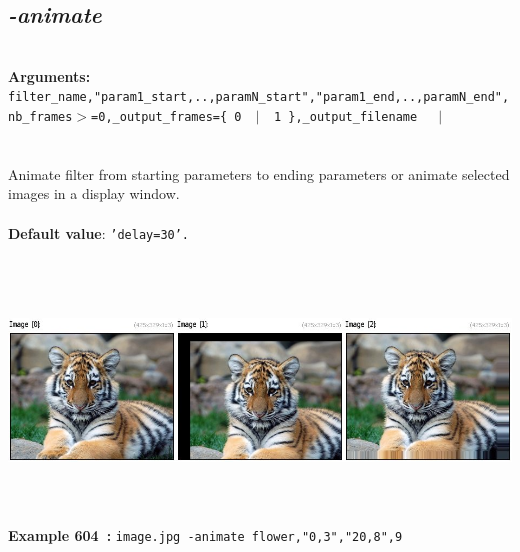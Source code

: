 \documentclass[a4paper,11pt,twoside]{book}
\begin{document}
\subsection{\emph{-animate} }\vspace*{-0.5em}
~\\\textbf{Arguments: } 
{\small \texttt{filter\_name,"param1\_start,..,paramN\_start","param1\_end,..,paramN\_end",nb\_frames$>$=0,\_output\_frames=\{ 0 ~$|$~ 1 \},\_output\_filename}}~~~$|$\\
\\~\\
Animate filter from starting parameters to ending parameters or animate selected images
in a display window.
~\\~\\\textbf{Default value}: {\small \texttt{'delay=30'.}}
\begin{center}\includegraphics[keepaspectratio=true,height=7cm,width=\textwidth]{img/gmic_def604.jpg}\\
{\footnotesize \textbf{Example 604~:} \texttt{image.jpg -animate flower,"0,3","20,8",9}}
\end{center}
\end{document}
